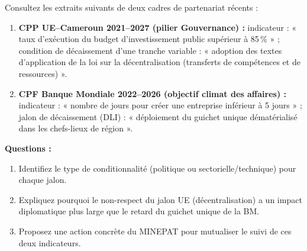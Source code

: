 \documentclass[11pt]{article}
\begin{document}
\begin{exercice}
Consultez les extraits suivants de deux cadres de partenariat récents :
\begin{enumerate}
    \item \textbf{CPP UE--Cameroun 2021--2027 (pilier Gouvernance) :} indicateur : « taux d'exécution du budget d'investissement public supérieur à 85\,\% » ; condition de décaissement d'une tranche variable : « adoption des textes d'application de la loi sur la décentralisation (transferts de compétences et de ressources) ».
    \item \textbf{CPF Banque Mondiale 2022--2026 (objectif climat des affaires) :} indicateur : « nombre de jours pour créer une entreprise inférieur à 5 jours » ; jalon de décaissement (DLI) : « déploiement du guichet unique dématérialisé dans les chefs-lieux de région ».
\end{enumerate}
\textbf{Questions :}
\begin{enumerate}
    \item Identifiez le type de conditionnalité (politique ou sectorielle/technique) pour chaque jalon.
    \item Expliquez pourquoi le non-respect du jalon UE (décentralisation) a un impact diplomatique plus large que le retard du guichet unique de la BM.
    \item Proposez une action concrète du MINEPAT pour mutualiser le suivi de ces deux indicateurs.
\end{enumerate}
\end{exercice}
\end{document}
